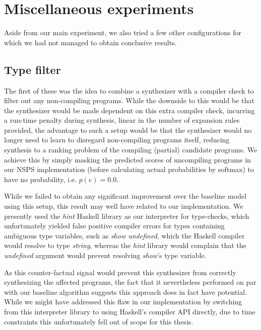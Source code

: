 \documentclass{article}
\begin{document}
\section{Miscellaneous experiments}

Aside from our main experiment, we also tried a few other configurations for which we had not managed to obtain conclusive results.

\subsection{Type filter}

The first of these was the idea to combine a synthesizer with a compiler check to filter out any non-compiling programs.
While the downside to this would be that the synthesizer would be made dependent on this extra compiler check,
incurring a run-time penalty during synthesis, linear in the number of expansion rules provided,
the advantage to such a setup would be that the synthesizer would no longer need to learn to disregard non-compiling programs itself,
reducing synthesis to a ranking problem of the compiling (partial) candidate programs.
% 
% 
We achieve this by simply masking the predicted scores of uncompiling programs in our NSPS implementation
(before calculating actual probabilities by softmax) to have no probability, i.e. $p(e)=0.0$.

While we failed to obtain any significant improvement over the baseline model using this setup,
this result may well have related to our implementation.
We presently used the \emph{hint} Haskell library as our interpreter for type-checks,
which unfortunately yielded false positive compiler errors for types containing ambiguous type variables,
such as \emph{show undefined}, which the Haskell compiler would resolve to type \emph{string},
whereas the \emph{hint} library would complain that the \emph{undefined}
argument would prevent resolving \emph{show}'s type variable.~\citep{hintambiguous}

As this counter-factual signal would prevent this synthesizer from correctly synthesizing the affected programs,
the fact that it nevertheless performed on par with our baseline algorithm suggests this approach does in fact have potential.
While we might have addressed this flaw in our implementation by switching
from this interpreter library to using Haskell's compiler API directly,
due to time constraints this unfortunately fell out of scope for this thesis.
\end{document}
